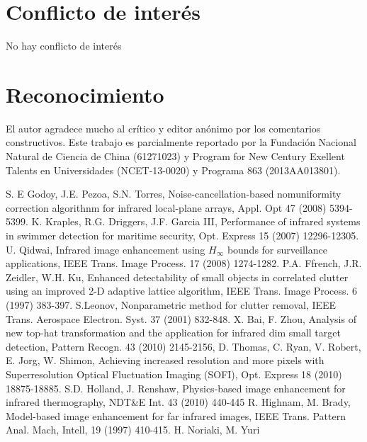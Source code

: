 \documentclass[a4paper, 11 pt, conference]{ieeeconf}      %
\begin{document}
\section*{\textbf{Conflicto de inter\'es}}

No hay conflicto de inter\'es

\section*{\textbf{Reconocimiento}}

El autor agradece mucho al cr\'itico y editor an\'onimo por los comentarios constructivos. Este trabajo es parcialmente reportado por la Fundaci\'on Nacional Natural de Ciencia de China (61271023) y Program for New Century Exellent Talents en Universidades (NCET-13-0020) y Programa 863 (2013AA013801).

\begin{thebibliography}{99}

 S. E Godoy, J.E. Pezoa, S.N. Torres, Noise-cancellation-based nomuniformity correction algorithnm for infrared local-plane arrays, Appl. Opt 47 (2008) 5394-5399.
 K. Kraples, R.G. Driggers, J.F. Garcia III, Performance of infrared systems in swimmer detection for maritime security, Opt. Express 15 (2007) 12296-12305.
 U. Qidwai, Infrared image enhancement using $H_\infty$ bounds for surveillance applications, IEEE Trans. Image Process. 17 (2008) 1274-1282.
 P.A. Ffrench, J.R. Zeidler, W.H. Ku, Enhanced detectability of small objects in correlated clutter using an improved 2-D adaptive lattice algorithm, IEEE Trans. Image Process. 6 (1997) 383-397.
 S.Leonov, Nonparametric method for clutter removal, IEEE Trans. Aerospace Electron. Syst. 37 (2001) 832-848.
 X. Bai, F. Zhou, Analysis of new top-hat transformation and the application for infrared dim small target detection, Pattern Recogn. 43 (2010) 2145-2156,
 D. Thomas, C. Ryan, V. Robert, E. Jorg, W. Shimon, Achieving increased resolution and more pixels with Superresolution Optical Fluctuation Imaging (SOFI), Opt. Express 18 (2010) 18875-18885.
 S.D. Holland, J. Renshaw, Physics-based image enhancement for infrared thermography, NDT&E Int. 43 (2010) 440-445
 R. Highnam, M. Brady, Model-based image enhancement for far infrared images, IEEE Trans. Pattern Anal. Mach, Intell,  19 (1997) 410-415.
 H. Noriaki, M. Yuri

\end{thebibliography}
\end{document}
